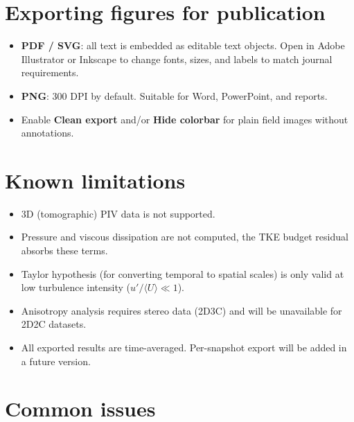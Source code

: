 \documentclass[11pt, a4paper]{report}
\newcommand{\uipth}[1]{\textbf{\textcolor{upblue}{#1}}}
\begin{document}
\section{Exporting figures for publication}

\begin{itemize}[leftmargin=1.5em]
  \item \textbf{PDF / SVG}: all text is embedded as editable text objects. Open in Adobe Illustrator or Inkscape to change fonts, sizes, and labels to match journal requirements.
  \item \textbf{PNG}: 300 DPI by default. Suitable for Word, PowerPoint, and reports.
  \item Enable \uipth{Clean export} and/or \uipth{Hide colorbar} for plain field images without annotations.
\end{itemize}

\section{Known limitations}

\begin{itemize}[leftmargin=1.5em]
  \item 3D (tomographic) PIV data is not supported.
  \item Pressure and viscous dissipation are not computed, the TKE budget residual absorbs these terms.
  \item Taylor hypothesis (for converting temporal to spatial scales) is only valid at low turbulence intensity ($u'/\langle U\rangle \ll 1$).
  \item Anisotropy analysis requires stereo data (2D3C) and will be unavailable for 2D2C datasets.
  \item All exported results are time-averaged. Per-snapshot export will be added in a future version.
\end{itemize}

\section{Common issues}
\end{document}

